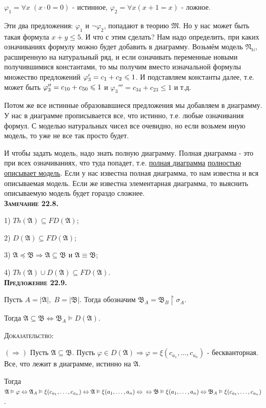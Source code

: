 \documentclass[18pt, a4paper]{extarticle}
\newcommand{\predl}[1]{\textbf{\textsc{Предложение #1}}}
\newcommand{\zam}[1]{\textbf{\textsc{Замечание #1}}}
\newcommand{\vp}{\varphi}
\newcommand{\vD}{\vDash}
\newcommand{\sg}{\sigma}
\newcommand{\rightdok}{\boxed{(\Rightarrow)}}
\newcommand{\mA}{\mathfrak{A}}
\newcommand{\mB}{\mathfrak{B}}
\newcommand{\mR}{\mathfrak{N}}
\newcommand{\mM}{\mathfrak{M}}
\newcommand{\dok}{\textsc{Доказательство:}}
\begin{document}
$\vp_1=\forall x\;(x\cdot0=0)$ - истинное, $\vp_2=\forall x(x+1=x)$ - ложное. 

Эти два предложения: $\vp_1$ и $\lnot\vp_2$, попадают в теорию $\mM$. Но у нас может быть такая формула $x+y\leqslant5$. И что с этим сделать? Нам надо определить, при каких означиваниях формулу можно будет добавить в диаграмму. Возьмём модель $\mR_{\mathbb N}$, расширенную на натуральный ряд, и если означивать переменные новыми получившимися константами, то мы получим вместо изначальной формулы множество предложений 
$\newline\vp_3'=c_1+c_2\leqslant 1$. И подставляем константы далее, т.е. может быть $\newline\vp_3''=c_{10}+c_{50}\leqslant 1$ и $\vp_3'''=c_{34}+c_{23}\leqslant 1$ и т.д.

Потом же все истинные образовавшиеся предложения мы добавляем в диаграмму. У нас в диаграмме прописывается все, что истинно, т.е. любые означивания формул. С моделью натуральных чисел все очевидно, но если возьмем иную модель, то уже не все так просто будет. 

И чтобы задать модель, надо знать полную диаграмму. Полная диаграмма - это при всех означиваниях, что туда попадет, т.е. \underline{полная диаграмма} \underline{полностью описывает модель}. Если у нас известна полная диаграмма, то нам известна и вся описываемая модель. Если же известна элементарная диаграмма, то выяснить описываемую модель будет гораздо сложнее.\\

\zam {22.8.} 

1) $Th(\mA)\subseteq FD(\mA)$; 

2) $D(\mA)\subseteq FD(\mA)$; 

3) $\mA\preccurlyeq\mB\Rightarrow\mA\subseteq\mB$ и $\mA\equiv\mB$;

4) $Th(\mA)\cup D(\mA)\subseteq FD(\mA)$.\\

\predl {22.9.} 

Пусть $A=|\mA|,\;B=|\mB|$. Тогда обозначим $\mB_A=\mB_B\upharpoonright\sg_A$.

Тогда $\mA\subseteq\mB\Leftrightarrow\mB_A\vD D(\mA)$.

\dok

$\rightdok$ Пусть $\mA\subseteq\mB$. Пусть $\vp\in D(\mA)\Rightarrow\vp=\xi(c_{a_1},\dots,c_{a_n})$ - бескванторная. Все, что лежит в диаграмме, истинно на $\mA$. 

Тогда $\mA\vD\vp\Leftrightarrow\mA_A\vD\xi(c_{a_1},\dots,c_{a_n})\Leftrightarrow\mA\vD\xi(a_1,\dots,a_n)\Leftrightarrow\newline \Leftrightarrow\mB\vD\xi(a_1,\dots,a_n)\Leftrightarrow\mB_A\vD\xi(c_{a_1},\dots,c_{a_n})$.
\end{document}
